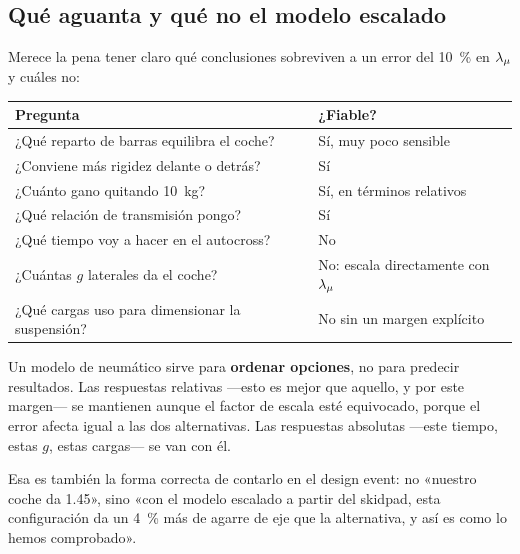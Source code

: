 \subsection{Qué aguanta y qué no el modelo escalado}

Merece la pena tener claro qué conclusiones sobreviven a un error del
\SI{10}{\percent} en $\lambda_{\mu}$ y cuáles no:

\begin{center}
\begin{tabularx}{\textwidth}{@{}Xl@{}}
\toprule
\textbf{Pregunta} & \textbf{¿Fiable?} \\
\midrule
¿Qué reparto de barras equilibra el coche? & Sí, muy poco sensible \\
¿Conviene más rigidez delante o detrás? & Sí \\
¿Cuánto gano quitando \SI{10}{\kilogram}? & Sí, en términos relativos \\
¿Qué relación de transmisión pongo? & Sí \\
¿Qué tiempo voy a hacer en el autocross? & No \\
¿Cuántas $g$ laterales da el coche? & No: escala directamente con $\lambda_{\mu}$ \\
¿Qué cargas uso para dimensionar la suspensión? & No sin un margen explícito \\
\bottomrule
\end{tabularx}
\end{center}

\begin{clave}
Un modelo de neumático sirve para \textbf{ordenar opciones}, no para predecir
resultados. Las respuestas relativas ---esto es mejor que aquello, y por este
margen--- se mantienen aunque el factor de escala esté equivocado, porque el
error afecta igual a las dos alternativas. Las respuestas absolutas ---este
tiempo, estas $g$, estas cargas--- se van con él.

Esa es también la forma correcta de contarlo en el design event: no «nuestro
coche da \SI{1.45}{\gacc}», sino «con el modelo escalado a partir del skidpad,
esta configuración da un \SI{4}{\percent} más de agarre de eje que la
alternativa, y así es como lo hemos comprobado».
\end{clave}


